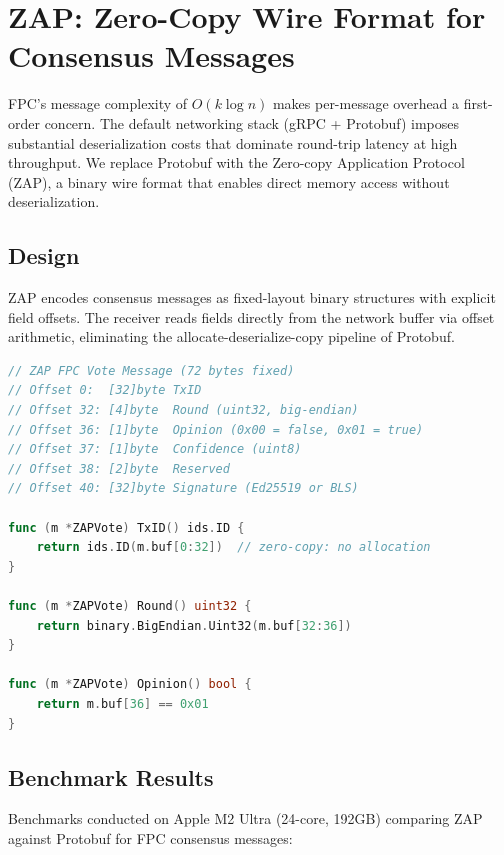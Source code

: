 \section{ZAP: Zero-Copy Wire Format for Consensus Messages}

\label{sec:zap}

FPC's message complexity of $O(k \log n)$ makes per-message overhead a first-order concern. The default networking stack (gRPC + Protobuf) imposes substantial deserialization costs that dominate round-trip latency at high throughput. We replace Protobuf with the Zero-copy Application Protocol (ZAP), a binary wire format that enables direct memory access without deserialization.

\subsection{Design}

ZAP encodes consensus messages as fixed-layout binary structures with explicit field offsets. The receiver reads fields directly from the network buffer via offset arithmetic, eliminating the allocate-deserialize-copy pipeline of Protobuf.

\begin{lstlisting}[language=Go, caption=ZAP message layout for FPC vote]
// ZAP FPC Vote Message (72 bytes fixed)
// Offset 0:  [32]byte TxID
// Offset 32: [4]byte  Round (uint32, big-endian)
// Offset 36: [1]byte  Opinion (0x00 = false, 0x01 = true)
// Offset 37: [1]byte  Confidence (uint8)
// Offset 38: [2]byte  Reserved
// Offset 40: [32]byte Signature (Ed25519 or BLS)

func (m *ZAPVote) TxID() ids.ID {
    return ids.ID(m.buf[0:32])  // zero-copy: no allocation
}

func (m *ZAPVote) Round() uint32 {
    return binary.BigEndian.Uint32(m.buf[32:36])
}

func (m *ZAPVote) Opinion() bool {
    return m.buf[36] == 0x01
}
\end{lstlisting}

\subsection{Benchmark Results}

Benchmarks conducted on Apple M2 Ultra (24-core, 192GB) comparing ZAP against Protobuf for FPC consensus messages:

